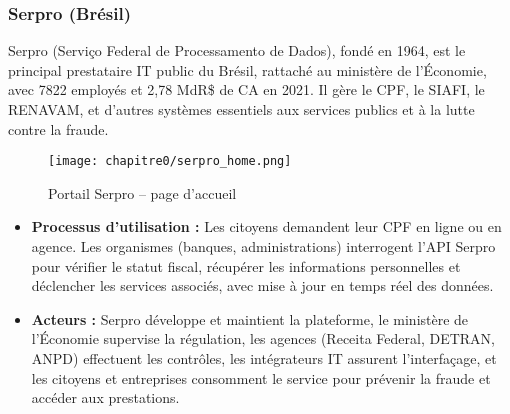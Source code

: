 \subsubsection{Serpro (Brésil)}
Serpro\cite{b5,b40} (Serviço Federal de Processamento de Dados), fondé en 1964, est le principal prestataire IT public du Brésil, rattaché au ministère de l’Économie, avec 7822 employés et 2{,}78 MdR\$ de CA en 2021\cite{b41}. Il gère le CPF, le SIAFI, le RENAVAM, et d’autres systèmes essentiels aux services publics et à la lutte contre la fraude\cite{b40}.\\
\begin{figure}[H]
  \centering
  \texttt{[image: chapitre0/serpro\_home.png]}
  \caption{Portail Serpro – page d’accueil}
\end{figure}
\begin{itemize}[label=\textbullet]
  \item \textbf{Processus d'utilisation :} Les citoyens demandent leur CPF en ligne ou en agence. Les organismes (banques, administrations) interrogent l’API Serpro pour vérifier le statut fiscal, récupérer les informations personnelles et déclencher les services associés, avec mise à jour en temps réel des données\cite{b42}.
  \item \textbf{Acteurs :} Serpro développe et maintient la plateforme, le ministère de l’Économie supervise la régulation, les agences (Receita Federal, DETRAN, ANPD) effectuent les contrôles, les intégrateurs IT assurent l’interfaçage, et les citoyens et entreprises consomment le service pour prévenir la fraude et accéder aux prestations\cite{b42}.
\end{itemize}






